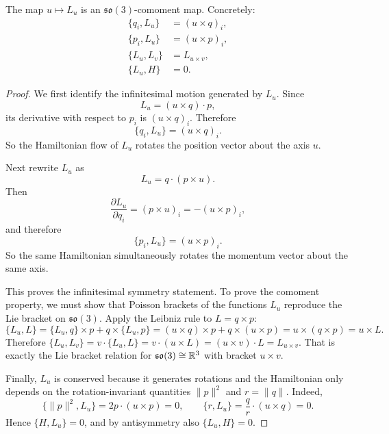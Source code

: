 \begin{theorem}\label{thm:rotational-comoment}
The map $u \mapsto L_u$ is an $\mathfrak{so}(3)$-comoment map.
Concretely:
\begin{align*}
  \{q_i, L_u\} &= (u \times q)_i, \\
  \{p_i, L_u\} &= (u \times p)_i, \\
  \{L_u, L_v\} &= L_{u \times v}, \\
  \{L_u, H\}   &= 0.
\end{align*}
\leanok
\begin{proof}
We first identify the infinitesimal motion generated by $L_u$.
Since
\[
  L_u = (u \times q) \cdot p,
\]
its derivative with respect to $p_i$ is $(u \times q)_i$.
Therefore
\[
  \{q_i, L_u\} = (u \times q)_i.
\]
So the Hamiltonian flow of $L_u$ rotates the position vector about the axis $u$.

Next rewrite $L_u$ as
\[
  L_u = q \cdot (p \times u).
\]
Then
\[
  \frac{\partial L_u}{\partial q_i} = (p \times u)_i = -(u \times p)_i,
\]
and therefore
\[
  \{p_i, L_u\} = (u \times p)_i.
\]
So the same Hamiltonian simultaneously rotates the momentum vector about the same axis.

This proves the infinitesimal symmetry statement.
To prove the comoment property, we must show that Poisson brackets of the functions $L_u$ reproduce the Lie bracket on $\mathfrak{so}(3)$.
Apply the Leibniz rule to $L = q \times p$:
\[
  \{L_u, L\}
  = \{L_u, q\} \times p + q \times \{L_u, p\}
  = (u \times q) \times p + q \times (u \times p)
  = u \times (q \times p)
  = u \times L.
\]
Therefore $\{L_u, L_v\} = v \cdot \{L_u, L\} = v \cdot (u \times L) = (u \times v) \cdot L = L_{u \times v}$.
That is exactly the Lie bracket relation for $\mathfrak{so}(3) \cong \mathbb{R}^3$ with bracket $u \times v$.

Finally, $L_u$ is conserved because it generates rotations and the Hamiltonian only depends on the rotation-invariant quantities $\|p\|^2$ and $r = \|q\|$.
Indeed,
\[
  \{\|p\|^2, L_u\} = 2p \cdot (u \times p) = 0,
  \qquad
  \{r, L_u\} = \frac{q}{r} \cdot (u \times q) = 0.
\]
Hence $\{H, L_u\} = 0$, and by antisymmetry also $\{L_u, H\} = 0$.
\end{proof}
\end{theorem}

